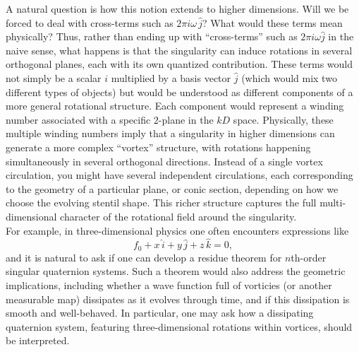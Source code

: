 \documentclass[12pt]{article}
\begin{document}
A natural question is how this notion extends to higher dimensions. Will we be forced to deal with cross-terms such as $2\pi i \omega \, \hat{j}$? What would these terms mean physically? Thus, rather than ending up with “cross-terms” such as $2\pi i \omega \hat j$ in the naive sense, what happens is that the singularity can induce rotations in several orthogonal planes, each with its own quantized contribution. These terms would not simply be a scalar $i$ multiplied by a basis vector $\hat j$ (which would mix two different types of objects) but would be understood as different components of a more general rotational structure. Each component would represent a winding number associated with a specific $2$-plane in the $kD$ space. Physically, these multiple winding numbers imply that a singularity in higher dimensions can generate a more complex “vortex” structure, with rotations happening simultaneously in several orthogonal directions. Instead of a single vortex circulation, you might have several independent circulations, each corresponding to the geometry of a particular plane, or conic section, depending on how we choose the evolving stentil shape. This richer structure captures the full multi-dimensional character of the rotational field around the singularity. \\ 

For example, in three-dimensional physics one often encounters expressions like
\[
f_{0} + x\,\hat{i} + y\,\hat{j} + z\,\hat{k} = 0,
\]
and it is natural to ask if one can develop a residue theorem for \(n\)th-order singular quaternion systems. Such a theorem would also address the geometric implications, including whether a wave function full of vorticies (or another measurable map) dissipates as it evolves through time, and if this dissipation is smooth and well-behaved. In particular, one may ask how a dissipating quaternion system, featuring three-dimensional rotations within vortices, should be interpreted.\\
\end{document}
